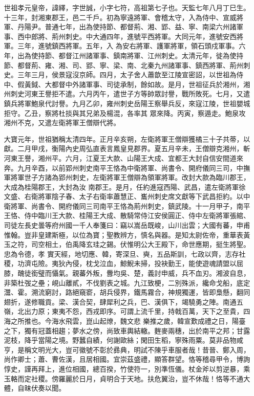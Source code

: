 
\begin{pinyinscope}

 世祖孝元皇帝，諱繹，字世誠，小字七符，高祖第七子也。天監七年八月丁巳生。十三年，封湘東郡王，邑二千戶。初為寧遠將軍、會稽太守，入為侍中、宣威將軍、丹陽尹。普通七年，出為使持節、都督荊、湘、郢、益、寧、南梁六州諸軍事、西中郎將、荊州刺史。中大通四年，進號平西將軍。大同元年，進號安西將軍。三年，進號鎮西將軍。五年，入
 為安右將軍、護軍將軍，領石頭戍軍事。六年，出為使持節、都督江州諸軍事、鎮南將軍、江州刺史。太清元年，徙為使持節、都督荊、雍、湘、司、郢、寧、梁、南、北秦九州諸軍事、鎮西將軍、荊州刺史。三年三月，侯景寇沒京師。四月，太子舍人蕭歆至江陵宣密詔，以世祖為侍中、假黃鉞、大都督中外諸軍事、司徒承制，餘如故。是月，世祖征兵於湘州，湘州刺史河東王譽拒不遣。六月丙午，遣世子方等帥眾討譽，戰所敗死。七月，又遣鎮兵將軍鮑泉代討譽。九月乙卯，雍州刺史岳陽王察舉兵反，來寇江陵，世祖嬰城拒守。乙丑，察將杜掞與其兄弟及楊混，各率其
 眾來降。丙寅，察遁走。鮑泉攻湘州不克，又遣左衛將軍王僧辯代將。



 大寶元年，世祖猶稱太清四年。正月辛亥朔，左衛將軍王僧辯獲橘三十子共蒂，以獻。二月甲戌，衡陽內史周弘直表言鳳皇見郡界。夏五月辛未，王僧辯克湘州，斬河東王譽，湘州平。六月，江夏王大款、山陽王大成、宜都王大封自信安間道來奔。九月辛酉，以前郢州刺史南平王恪為中衛將軍、尚書令、開府儀同三司，中撫軍將軍世子方諸為郢州刺史，左衛將軍王僧辯為領軍將軍。改封大款為臨川郡王，大成為桂陽郡王，大封為汝
 南郡王。是月，任約進寇西陽、武昌，遣左衛將軍徐文盛、右衛將軍陰子春、太子右衛率蕭慧正、巂州刺史席文獻等下武昌拒約。以中衛將軍、尚書令、開府儀同三司南平王恪為荊州刺史，鎮武陵。十一月甲子，南平王恪、侍中臨川王大款、桂陽王大成、散騎常侍江安侯圓正、侍中左衛將軍張綰、司徒左長史曇等府州國一千人奉箋曰：竊以嵩岳既峻，山川出雲；大國有蕃，申甫惟翰。豈非皇建斯極，以位為寶；聖教辨方，慎名與器。是知太尉佐帝，重華表黃玉之符，司空相土，伯禹降玄珪之錫。伏惟明公大王殿下，命世應期，挺生將聖。忠為令德，孝
 實天經，地切應、韓，寄深旦、奭，五品斯訓，七政以齊，志存社稷，功濟屯險。夷狄內侵，枕戈泣血，鯨鯢未掃，投袂勤王，能使遊魂請盟以屈膝，醜徒銜璧而懾氣。親蕃外叛，釁均吳、楚，義討申威，兵不血刃。湘波自息，非築杜弢之壘；峴山離貳，不伐劉表之城。九江致梗，二別殊派，纔命戈船，底定灊、霍。溯流窮討，路絕窺窬，胡兵侵界，鐵馬霧合，神規獨運，皆即梟懸，翻同翅折，遂修職貢。梁、漢合契，肆犀利之兵，巴、漢俱下，竭驍勇之陣。南通五嶺，北出力原；東夷不怨，西戎即序。可謂上流千里，持戟百萬，天下之至貴，四海之所推也。今海水飛雲，崑山起燎，魏文悲
 樂推之歲，韓宣歎成禮之日，陽臺之下，獨有冠蓋相趨；夢水之傍，尚致車輿結轍。麰麥兩穗，出於南平之邦；甘露泥枝，降乎當陽之境。野蠶自績，何謝歐絲；閑田生稻，寧殊雨粟。莫非品物咸亨，是稱文明光大，豈可徽號不彰於彞典，明試不陳乎車服者哉！昔晉、鄭入周，尚作卿士；蕭、曹佐漢，且居相國。宜崇茲盛禮，顯答群望。恪等稽尋甲令，博詢惇史，謹再拜上，進位相國，總百揆，竹使符一，別準恆儀。杖金斧以剪逆暴，乘玉輅而定社稷。傍羅麗於日月，貞明合于天地。扶危翼治，豈不休哉！恪等不通大體，自昧伏奏以聞。




\end{pinyinscope}
